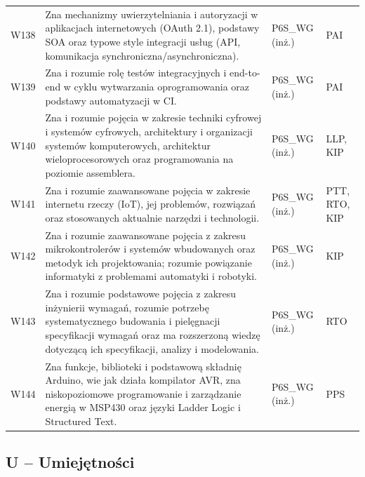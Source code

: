 \documentclass[12pt,a4paper]{article}
\begin{document}
{\begin{longtable}{m{1cm}m{8.8cm}m{2.1cm}m{2.5cm}}
\rowcolor{tableRowAlt} W138 & Zna mechanizmy uwierzytelniania i autoryzacji w aplikacjach internetowych (OAuth 2.1), podstawy SOA oraz typowe style integracji usług (API, komunikacja synchroniczna/asynchroniczna). & {\scriptsize P6S\_WG {\scriptsize (inż.)}} & {\scriptsize PAI} \\
\rowcolor{tableRowLight} W139 & Zna i rozumie rolę testów integracyjnych i end-to-end w cyklu wytwarzania oprogramowania oraz podstawy automatyzacji w CI. & {\scriptsize P6S\_WG {\scriptsize (inż.)}} & {\scriptsize PAI} \\
\rowcolor{tableRowAlt} W140 & Zna i rozumie pojęcia w zakresie techniki cyfrowej i systemów cyfrowych, architektury i organizacji systemów komputerowych, architektur wieloprocesorowych oraz programowania na poziomie assemblera. & {\scriptsize P6S\_WG {\scriptsize (inż.)}} & {\scriptsize LLP, KIP} \\
\rowcolor{tableRowLight} W141 & Zna i rozumie zaawansowane pojęcia w zakresie internetu rzeczy (IoT), jej problemów, rozwiązań oraz stosowanych aktualnie narzędzi i technologii. & {\scriptsize P6S\_WG {\scriptsize (inż.)}} & {\scriptsize PTT, RTO, KIP} \\
\rowcolor{tableRowAlt} W142 & Zna i rozumie zaawansowane pojęcia z zakresu mikrokontrolerów i systemów wbudowanych oraz metodyk ich projektowania; rozumie powiązanie informatyki z problemami automatyki i robotyki. & {\scriptsize P6S\_WG {\scriptsize (inż.)}} & {\scriptsize KIP} \\
\rowcolor{tableRowLight} W143 & Zna i rozumie podstawowe pojęcia z zakresu inżynierii wymagań, rozumie potrzebę systematycznego budowania i pielęgnacji specyfikacji wymagań oraz ma rozszerzoną wiedzę dotyczącą ich specyfikacji, analizy i modelowania. & {\scriptsize P6S\_WG {\scriptsize (inż.)}} & {\scriptsize RTO} \\
\rowcolor{tableRowAlt} W144 & Zna funkcje, biblioteki i podstawową składnię Arduino, wie jak działa kompilator AVR, zna niskopoziomowe programowanie i zarządzanie energią w MSP430 oraz języki Ladder Logic i Structured Text. & {\scriptsize P6S\_WG {\scriptsize (inż.)}} & {\scriptsize PPS} \\
\bottomrule
\end{longtable}}

\subsection*{U -- Umiejętności}
\end{document}
